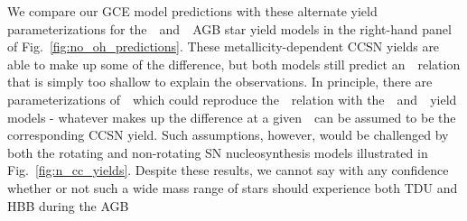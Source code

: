 \documentclass[ms.tex]{subfiles}
\begin{document}
\par
We compare our GCE model predictions with these alternate yield
parameterizations for the~\karakasten~and~\karakas~AGB star yield models in
the right-hand panel of Fig.~\ref{fig:no_oh_predictions}.
These metallicity-dependent CCSN yields are able to make up some of the
difference, but both models still predict an~\ohno~relation that is simply
too shallow to explain the observations.
In principle, there are parameterizations of~~which could reproduce
the~\ohno~relation with the~\karakasten~and~\karakas~yield models - whatever
makes up the difference at a given~\oh~can be assumed to be the corresponding
CCSN yield.
Such assumptions, however, would be challenged by both the rotating and
non-rotating SN nucleosynthesis models illustrated in
Fig.~\ref{fig:n_cc_yields}.
Despite these results, we cannot say with any confidence whether or not such
a wide mass range of stars should experience both TDU and HBB during the AGB
\end{document}
